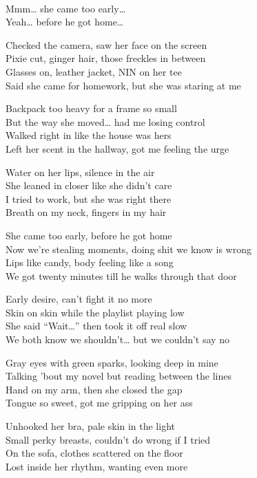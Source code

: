 \begin{lyrics}

\\
Mmm… she came too early…\\
Yeah… before he got home…

Checked the camera, saw her face on the screen\\
Pixie cut, ginger hair, those freckles in between\\
Glasses on, leather jacket, NIN on her tee\\
Said she came for homework, but she was staring at me

Backpack too heavy for a frame so small\\
But the way she moved… had me losing control\\
Walked right in like the house was hers\\
Left her scent in the hallway, got me feeling the urge

Water on her lips, silence in the air\\
She leaned in closer like she didn’t care\\
I tried to work, but she was right there\\
Breath on my neck, fingers in my hair

She came too early, before he got home\\
Now we’re stealing moments, doing shit we know is wrong\\
Lips like candy, body feeling like a song\\
We got twenty minutes till he walks through that door

Early desire, can’t fight it no more\\
Skin on skin while the playlist playing low\\
She said “Wait…” then took it off real slow\\
We both know we shouldn’t… but we couldn’t say no

Gray eyes with green sparks, looking deep in mine\\
Talking ’bout my novel but reading between the lines\\
Hand on my arm, then she closed the gap\\
Tongue so sweet, got me gripping on her ass

Unhooked her bra, pale skin in the light\\
Small perky breasts, couldn’t do wrong if I tried\\
On the sofa, clothes scattered on the floor\\
Lost inside her rhythm, wanting even more


\end{lyrics}
